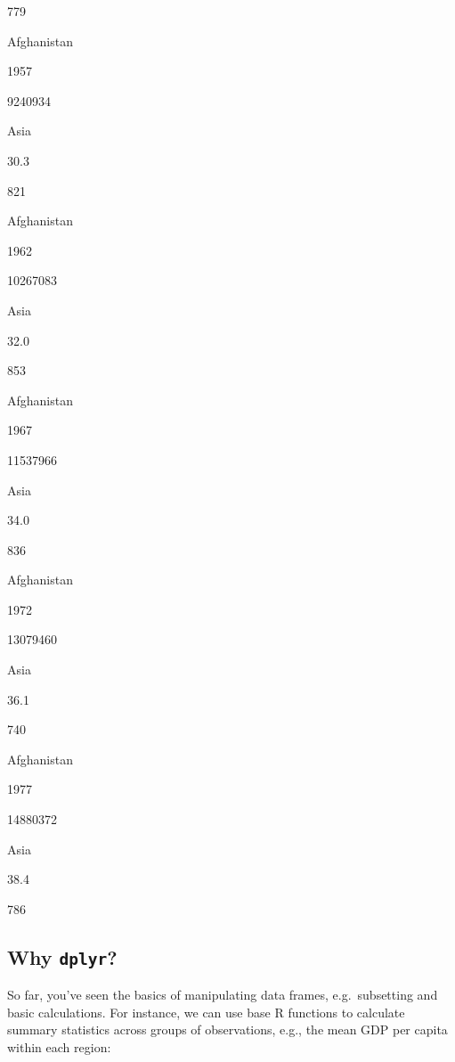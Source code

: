 \documentclass[]{book}
\newenvironment{Shaded}{\begin{snugshade}}{\end{snugshade}}
\newcommand{\KeywordTok}[1]{\textcolor[rgb]{0.13,0.29,0.53}{\textbf{#1}}}
\newcommand{\StringTok}[1]{\textcolor[rgb]{0.31,0.60,0.02}{#1}}
\newcommand{\CommentTok}[1]{\textcolor[rgb]{0.56,0.35,0.01}{\textit{#1}}}
\newcommand{\OperatorTok}[1]{\textcolor[rgb]{0.81,0.36,0.00}{\textbf{#1}}}
\newcommand{\NormalTok}[1]{#1}
\begin{document}
779

Afghanistan

1957

9240934

Asia

30.3

821

Afghanistan

1962

10267083

Asia

32.0

853

Afghanistan

1967

11537966

Asia

34.0

836

Afghanistan

1972

13079460

Asia

36.1

740

Afghanistan

1977

14880372

Asia

38.4

786

\subsection{\texorpdfstring{Why
\texttt{dplyr}?}{Why dplyr?}}\label{why-dplyr}

So far, you've seen the basics of manipulating data frames,
e.g.~subsetting and basic calculations. For instance, we can use base R
functions to calculate summary statistics across groups of observations,
e.g., the mean GDP per capita within each region:

\begin{Shaded}
\end{Shaded}
\end{document}
